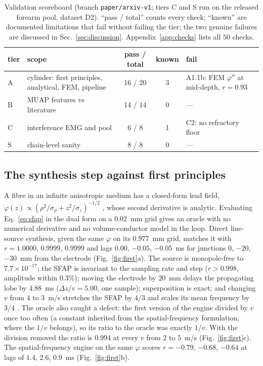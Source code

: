 \documentclass[11pt,a4paper]{article}
\begin{document}
\begin{table}[t]
\centering\small
\caption{Validation scoreboard (branch \texttt{paper/arxiv-v1}; tiers C and S run on the
released forearm pool, dataset D2). ``pass / total'' counts every check; ``known'' are
documented limitations that fail without failing the tier; the two genuine failures are
discussed in Sec.~\ref{sec:discussion}. Appendix~\ref{app:checks} lists all $50$ checks.}
\label{tab:score}
\begin{tabular}{lp{58mm}ccp{42mm}}
\toprule
tier & scope & pass / total & known & fail \\
\midrule
A & cylinder: first principles, analytical, FEM, pipeline & 16 / 20 & 3 & A1.1b: FEM $\varphi''$ at mid-depth, $r=0.93$ \\
B & MUAP features vs literature & 14 / 14 & 0 & --- \\
C & interference EMG and pool & 6 / 8 & 1 & C2: no refractory floor \\
S & chain-level sanity & 8 / 8 & 0 & --- \\
\bottomrule
\end{tabular}
\end{table}

\subsection{The synthesis step against first principles}
\label{sec:val-first}
A fibre in an infinite anisotropic medium has a closed-form lead field,
$\varphi(z) \propto (\rho^{2}/\sigma_\rho + z^{2}/\sigma_z)^{-1/2}$
\citep{plonsey2007bioelectricity, rush1963resistivity}, whose second derivative is
analytic. Evaluating Eq.~\eqref{eq:sfap} in the dual form on a $0.02$~mm grid gives an
oracle with no numerical derivative and no volume-conductor model in the loop. Direct
line-source synthesis, given the same $\varphi$ on its $0.977$~mm grid, matches it with
$r = 1.0000$, $0.9999$, $0.9999$ and lags $0.00$, $-0.05$, $-0.05$~ms for junctions $0$,
$-20$, $-30$~mm from the electrode (Fig.~\ref{fig:first}a). The source is monopole-free to
$7.7\times10^{-17}$; the SFAP is invariant to the sampling rate and step ($r>0.998$,
amplitude within $0.3\%$); moving the electrode by $20$~mm delays the propagating lobe by
$4.88$~ms ($\Delta z/v = 5.00$, one sample); superposition is exact; and changing $v$
from $4$ to $3$~m/s stretches the SFAP by $4/3$ and scales its mean frequency by $3/4$
\citep{lindstrom1977interpretation}. The oracle also caught a defect: the first version
of the engine divided by $v$ once too often (a constant inherited from the
spatial-frequency formulation, where the $1/v$ belongs), so its ratio to the oracle was
exactly $1/v$. With the division removed the ratio is $0.994$ at every $v$ from $2$ to
$5$~m/s (Fig.~\ref{fig:first}c). The spatial-frequency engine on the same $\varphi$
scores $r = -0.79$, $-0.68$, $-0.64$ at lags of $1.4$, $2.6$, $0.9$~ms
(Fig.~\ref{fig:first}b).
\end{document}
